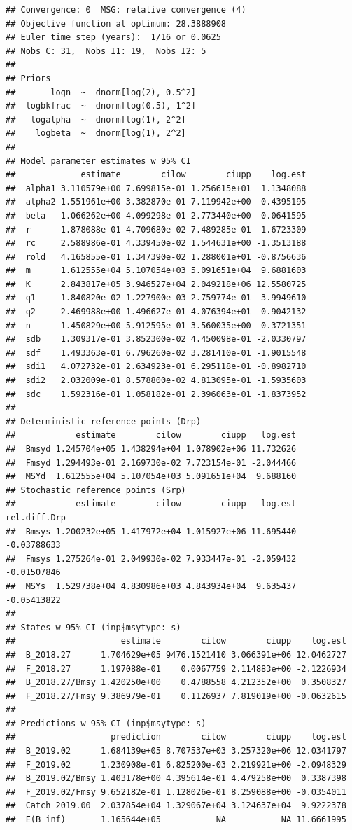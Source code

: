 \documentclass[
]{article}
\begin{document}
\begin{verbatim}
## Convergence: 0  MSG: relative convergence (4)
## Objective function at optimum: 28.3888908
## Euler time step (years):  1/16 or 0.0625
## Nobs C: 31,  Nobs I1: 19,  Nobs I2: 5
## 
## Priors
##       logn  ~  dnorm[log(2), 0.5^2]
##  logbkfrac  ~  dnorm[log(0.5), 1^2]
##   logalpha  ~  dnorm[log(1), 2^2]
##    logbeta  ~  dnorm[log(1), 2^2]
## 
## Model parameter estimates w 95% CI 
##             estimate        cilow        ciupp    log.est  
##  alpha1 3.110579e+00 7.699815e-01 1.256615e+01  1.1348088  
##  alpha2 1.551961e+00 3.382870e-01 7.119942e+00  0.4395195  
##  beta   1.066262e+00 4.099298e-01 2.773440e+00  0.0641595  
##  r      1.878088e-01 4.709680e-02 7.489285e-01 -1.6723309  
##  rc     2.588986e-01 4.339450e-02 1.544631e+00 -1.3513188  
##  rold   4.165855e-01 1.347390e-02 1.288001e+01 -0.8756636  
##  m      1.612555e+04 5.107054e+03 5.091651e+04  9.6881603  
##  K      2.843817e+05 3.946527e+04 2.049218e+06 12.5580725  
##  q1     1.840820e-02 1.227900e-03 2.759774e-01 -3.9949610  
##  q2     2.469988e+00 1.496627e-01 4.076394e+01  0.9042132  
##  n      1.450829e+00 5.912595e-01 3.560035e+00  0.3721351  
##  sdb    1.309317e-01 3.852300e-02 4.450098e-01 -2.0330797  
##  sdf    1.493363e-01 6.796260e-02 3.281410e-01 -1.9015548  
##  sdi1   4.072732e-01 2.634923e-01 6.295118e-01 -0.8982710  
##  sdi2   2.032009e-01 8.578800e-02 4.813095e-01 -1.5935603  
##  sdc    1.592316e-01 1.058182e-01 2.396063e-01 -1.8373952  
##  
## Deterministic reference points (Drp)
##            estimate        cilow        ciupp   log.est  
##  Bmsyd 1.245704e+05 1.438294e+04 1.078902e+06 11.732626  
##  Fmsyd 1.294493e-01 2.169730e-02 7.723154e-01 -2.044466  
##  MSYd  1.612555e+04 5.107054e+03 5.091651e+04  9.688160  
## Stochastic reference points (Srp)
##            estimate        cilow        ciupp   log.est rel.diff.Drp  
##  Bmsys 1.200232e+05 1.417972e+04 1.015927e+06 11.695440  -0.03788633  
##  Fmsys 1.275264e-01 2.049930e-02 7.933447e-01 -2.059432  -0.01507846  
##  MSYs  1.529738e+04 4.830986e+03 4.843934e+04  9.635437  -0.05413822  
## 
## States w 95% CI (inp$msytype: s)
##                     estimate        cilow        ciupp    log.est  
##  B_2018.27      1.704629e+05 9476.1521410 3.066391e+06 12.0462727  
##  F_2018.27      1.197088e-01    0.0067759 2.114883e+00 -2.1226934  
##  B_2018.27/Bmsy 1.420250e+00    0.4788558 4.212352e+00  0.3508327  
##  F_2018.27/Fmsy 9.386979e-01    0.1126937 7.819019e+00 -0.0632615  
## 
## Predictions w 95% CI (inp$msytype: s)
##                   prediction        cilow        ciupp    log.est  
##  B_2019.02      1.684139e+05 8.707537e+03 3.257320e+06 12.0341797  
##  F_2019.02      1.230908e-01 6.825200e-03 2.219921e+00 -2.0948329  
##  B_2019.02/Bmsy 1.403178e+00 4.395614e-01 4.479258e+00  0.3387398  
##  F_2019.02/Fmsy 9.652182e-01 1.128026e-01 8.259088e+00 -0.0354011  
##  Catch_2019.00  2.037854e+04 1.329067e+04 3.124637e+04  9.9222378  
##  E(B_inf)       1.165644e+05           NA           NA 11.6661995
\end{verbatim}
\end{document}
